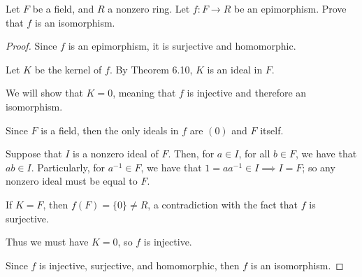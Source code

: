 \documentclass[../hw8]{subfiles}
\begin{document}
\begin{problem}
Let $F$ be a field, and $R$ a nonzero ring. Let $f:F\to R$ be an epimorphism.
Prove that $f$ is an isomorphism.
\end{problem}
\begin{proof}
	Since $f$ is an epimorphism, it is surjective and homomorphic.

	Let $K$ be the kernel of $f$.
	By Theorem 6.10, $K$ is an ideal in $F$.

	We will show that $K=0$, meaning that $f$ is injective and therefore an isomorphism.

	Since $F$ is a field, then the only ideals in $f$ are  $(0)$ and  $F$ itself.

	Suppose that $I$ is a nonzero ideal of  $F$.
	Then, for $a\in I$, for all $b\in F$, we have that $ab\in I$.
	Particularly, for $a^{-1}\in F$, we have that $1=aa^{-1}\in I \implies I = F$;
	so any nonzero ideal must be equal to $F$.

	If $K=F$, then  $f(F)=\{0\} \neq R$, a contradiction with the fact that $f$ is surjective.

	Thus we must have $K=0$, so  $f$ is injective.

	Since  $f$ is injective, surjective, and homomorphic, then $f$ is an isomorphism.
\end{proof}
\end{document}
